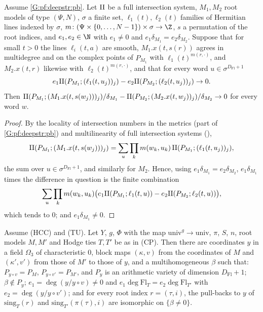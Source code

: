\begin{lemma}\label{pf:tower:rootcmp}
Assume \ref{G:pf:deepstr:pb}. Let $\mathrm{II}$ be a full intersection system, $M_1,M_2$ root models of type $(\Psi,N)$, $\sigma$ a
finite set, $\ell_1(t),\ell_2(t)$ families of Hermitian lines indexed by $\sigma$, $m\colon(\Psi\times\{0,\dots,N-1\})\times\sigma\to\Z$,
$s$ a permutation of the root indices, and $e_1,e_2\in\N$ with $e_1\ne0$ and $e_1\delta_{M_1}=e_2\delta_{M_2}$. Suppose that for
small $t>0$ the lines $\ell_i(t,a)$ are smooth, $M_1.x(t,s(r))$ agrees in multidegree and on the complex points of $P_{M_1}$
with $\ell_1(t)^{m(r,\cdot)}$, and $M_2.x(t,r)$ likewise with $\ell_2(t)^{m(r,\cdot)}$, and that for every word
$u\in\sigma^{D_{\mathrm{Fl}}+1}$
\[
e_1\mathrm{II}(P_{M_1};(\ell_1(t,u_j))_j)-e_2\mathrm{II}(P_{M_2};(\ell_2(t,u_j))_j)\to0.
\]
Then $\mathrm{II}(P_{M_1};(M_1.x(t,s(w_j)))_j)/\delta_{M_1}-\mathrm{II}(P_{M_2};(M_2.x(t,w_j))_j)/\delta_{M_2}\to0$ for every word $w$.
\end{lemma}

\begin{proof}
By the locality of intersection numbers in the metrics (part of \ref{G:pf:deepstr:pb}) and multilinearity of full intersection
systems (),
\[
\mathrm{II}(P_{M_1};(M_1.x(t,s(w_j)))_j)=\sum_u\prod_km(w_k,u_k)\,\mathrm{II}(P_{M_1};(\ell_1(t,u_j))_j),
\]
the sum over $u\in\sigma^{D_{\mathrm{Fl}}+1}$, and similarly for $M_2$. Hence, using $e_1\delta_{M_1}=e_2\delta_{M_2}$,
$e_1\delta_{M_1}$ times the difference in question is the finite combination
\[
\sum_u\prod_km(w_k,u_k)\bigl(e_1\mathrm{II}(P_{M_1};\ell_1(t,u))-e_2\mathrm{II}(P_{M_2};\ell_2(t,u))\bigr),
\]
which tends to $0$; and $e_1\delta_{M_1}\ne0$.
\end{proof}

\begin{lemma}\label{pf:tower:tiecmp}
Assume \textup{(HCC)} and \textup{(TU)}. Let $Y$, $g$, $\Phi$ with the map $\mathrm{univ}^g\to\mathrm{univ}$, $\pi$, $S$, $n$, root
models $M,M'$ and Hodge ties $T,T'$ be as in \textup{(CP)}. Then there are coordinates $y$ in a field $\Omega_3$ of
characteristic $0$, block maps $(\kappa,v)$ from the coordinates of $M$ and $(\kappa',v')$ from those of $M'$ to those of $y$,
and a multihomogeneous $\beta$ such that: $P_{y\circ v}=P_M$, $P_{y\circ v'}=P_{M'}$, and $P_y$ is an arithmetic variety of
dimension $D_{\mathrm{Fl}}+1$; $\beta\notin P_y$; $e_1=\deg(y/y\circ v)\ne0$ and $e_1\deg\mathrm{Fl}_T=e_2\deg\mathrm{Fl}_{T'}$ with
$e_2=\deg(y/y\circ v')$; and for every root index $r=(\tau,i)$, the pull-backs to $y$ of $\mathrm{sing}_T(r)$ and
$\mathrm{sing}_{T'}(\pi(\tau),i)$ are isomorphic on $\{\beta\ne0\}$.
\end{lemma}

